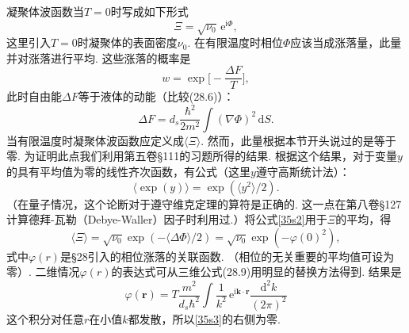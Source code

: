 凝聚体波函数当$T=0$时写成如下形式
\begin{equation*}
\Xi=\sqrt{\nu_{0}}\,\mathrm{e}^{\mathrm{i}\Phi},
\end{equation*}
这里引入$T=0$时凝聚体的表面密度$\nu_{0}$. 在有限温度时相位$\Phi$应该当成涨落量，此量并对涨落进行平均. 这些涨落的概率是
\begin{equation*}
w=\exp\Big[-\frac{\Delta F}{T}\Big],
\tag{35*.1}
\label{35s1}
\end{equation*}
此时自由能$\Delta F$等于液体的动能（比较(28.6)）：
\begin{equation*}
\Delta F=d_{s}\frac{\hbar^{2}}{2m^{2}}\int(\nabla\Phi)^{2}\,\mathrm{d}S.
\end{equation*}
当有限温度时凝聚体波函数应定义成$\langle\Xi\rangle$. 然而，此量根据本节开头说过的是等于零. 为证明此点我们利用第五卷§111的习题所得的结果. 根据这个结果，对于变量$y$的具有平均值为零的线性齐次函数，有公式（这里$y$遵守高斯统计法）：
\begin{equation*}
\langle\exp(y)\rangle=\exp(\langle y^{2}\rangle/2).
\tag{35*.2}
\label{35s2}
\end{equation*}
（在量子情况，这个论断对于遵守维克定理的算符是正确的. 这一点在第八卷§127计算德拜-瓦勒（Debye-Waller）因子时利用过.）将公式\eqref{35s2}用于$\Xi$的平均，得
\begin{equation*}
\langle\Xi\rangle=\sqrt{\nu_{0}}\exp(-\langle\Delta\Phi\rangle/2)
=\sqrt{\nu_{0}}\exp(-\varphi(0)^{2}),
\tag{35*.3}
\label{35s3}
\end{equation*}
式中$\varphi(r)$是§28引入的相位涨落的关联函数. （相位的无关重要的平均值可设为零）. 二维情况$\varphi(r)$的表达式可从三维公式(28.9)用明显的替换方法得到. 结果是
\begin{equation*}
\varphi(\bm{r})=T\frac{m^{2}}{d_{s}\hbar^{2}}\int\frac{1}{k^{2}}\,
\mathrm{e}^{\mathrm{i}\bm{k}\cdot\bm{r}}\frac{\mathrm{d}^{2}k}{(2\pi)^{2}}
\tag{35*.4}
\label{35s4}
\end{equation*}
这个积分对任意$r$在小值$k$都发散，所以\eqref{35s3}的右侧为零.

